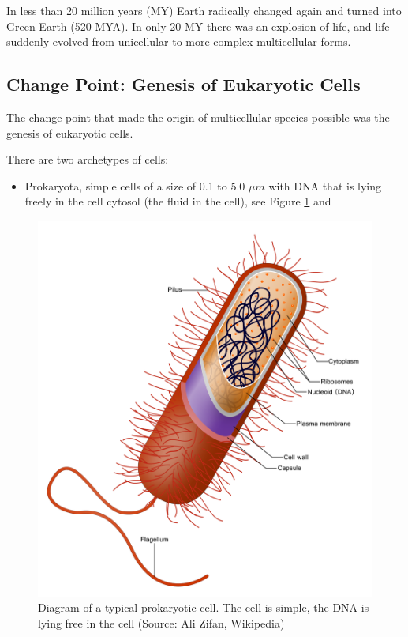 \documentclass[
  11pt,
]{book}
\providecommand{\tightlist}{%
  \setlength{\itemsep}{0pt}\setlength{\parskip}{0pt}}
\begin{document}
In less than 20 million years (MY) Earth radically changed again and turned into Green Earth (520 MYA). In only 20 MY there was an explosion of life, and life suddenly evolved from unicellular to more complex multicellular forms.

\hypertarget{change-point-genesis-of-eukaryotic-cells}{%
\subsection{Change Point: Genesis of Eukaryotic Cells}\label{change-point-genesis-of-eukaryotic-cells}}

The change point that made the origin of multicellular species possible was the genesis of eukaryotic cells.

There are two archetypes of cells:

\begin{itemize}
\tightlist
\item
  Prokaryota, simple cells of a size of 0.1 to 5.0 \(\mu m\) with DNA that is lying freely in the cell cytosol (the fluid in the cell), see Figure \ref{fig:prokaryotaCell} and
\end{itemize}

\begin{figure}

{\centering \includegraphics[width=0.5\linewidth]{./figs/prokaryoteCell} 

}

\caption{Diagram of a typical prokaryotic cell. The cell is simple, the DNA is lying free in the cell (Source: Ali Zifan, Wikipedia)}\label{fig:prokaryotaCell}
\end{figure}
\end{document}
